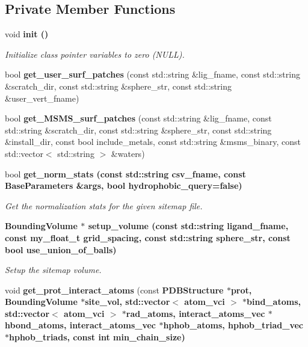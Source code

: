 \subsection*{Private Member Functions}
\begin{CompactItemize}
\item 
void \bf{init} ()\label{classASCbase_1_1Sitemap_2c579b022413645a8ecbdc4317117563}

\begin{CompactList}\small\item\em Initialize class pointer variables to zero (NULL). \item\end{CompactList}\item 
bool \textbf{get\_\-user\_\-surf\_\-patches} (const std::string \&lig\_\-fname, const std::string \&scratch\_\-dir, const std::string \&sphere\_\-str, const std::string \&user\_\-vert\_\-fname)\label{classASCbase_1_1Sitemap_bc73bf05cc0b7795b178657d537ab7d9}

\item 
bool \textbf{get\_\-MSMS\_\-surf\_\-patches} (const std::string \&lig\_\-fname, const std::string \&scratch\_\-dir, const std::string \&sphere\_\-str, const std::string \&install\_\-dir, const bool include\_\-metals, const std::string \&msms\_\-binary, const std::vector$<$ std::string $>$ \&waters)\label{classASCbase_1_1Sitemap_a35e5cc0fa7e11df3b9f5f237a01ab5c}

\item 
bool \bf{get\_\-norm\_\-stats} (const std::string csv\_\-fname, const \bf{Base\-Parameters} \&args, bool hydrophobic\_\-query=false)\label{classASCbase_1_1Sitemap_d692fc3eae9705af5c3b5151a18aad82}

\begin{CompactList}\small\item\em Get the normalization stats for the given sitemap file. \item\end{CompactList}\item 
\bf{Bounding\-Volume} $\ast$ \bf{setup\_\-volume} (const std::string ligand\_\-fname, const my\_\-float\_\-t grid\_\-spacing, const std::string sphere\_\-str, const bool use\_\-union\_\-of\_\-balls)
\begin{CompactList}\small\item\em Setup the sitemap volume. \item\end{CompactList}\item 
void \textbf{get\_\-prot\_\-interact\_\-atoms} (const \bf{PDBStructure} $\ast$prot, \bf{Bounding\-Volume} $\ast$site\_\-vol, std::vector$<$ atom\_\-vci $>$ $\ast$bind\_\-atoms, std::vector$<$ atom\_\-vci $>$ $\ast$rad\_\-atoms, interact\_\-atoms\_\-vec $\ast$hbond\_\-atoms, interact\_\-atoms\_\-vec $\ast$hphob\_\-atoms, hphob\_\-triad\_\-vec $\ast$hphob\_\-triads, const int min\_\-chain\_\-size)\label{classASCbase_1_1Sitemap_b38affd80a93bb4445f22c732b79e8cb}


\end{CompactItemize}
